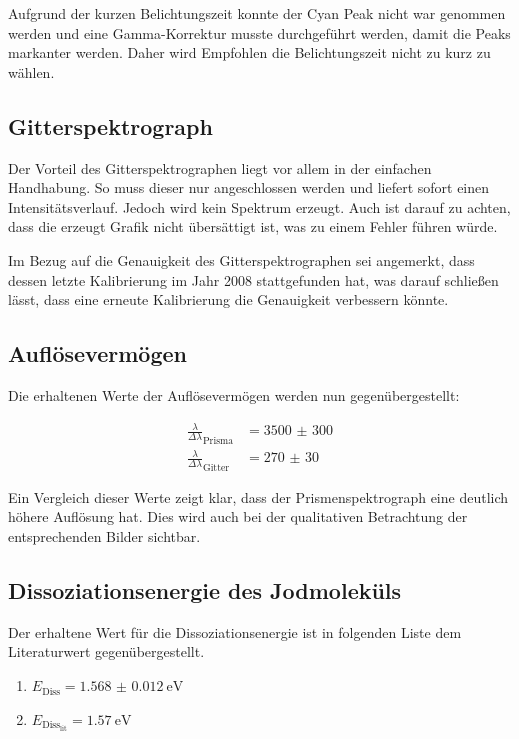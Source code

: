 \documentclass[12pt,english,ngerman]{scrartcl}
\begin{document}
Aufgrund der kurzen Belichtungszeit konnte der Cyan Peak nicht war genommen
werden und eine Gamma-Korrektur musste durchgeführt werden, damit die Peaks
markanter werden. Daher wird Empfohlen die Belichtungszeit nicht zu kurz zu
wählen.

\subsection{Gitterspektrograph}

Der Vorteil des Gitterspektrographen liegt vor allem in der einfachen
Handhabung. So muss dieser nur angeschlossen werden und liefert sofort einen
Intensitätsverlauf. Jedoch wird kein Spektrum erzeugt. Auch ist darauf zu
achten, dass die erzeugt Grafik nicht übersättigt ist, was zu einem Fehler
führen würde.

Im Bezug auf die Genauigkeit des Gitterspektrographen sei angemerkt, dass
dessen letzte Kalibrierung im Jahr 2008 stattgefunden hat, was darauf schließen
lässt, dass eine erneute Kalibrierung die Genauigkeit verbessern könnte.

\subsection{Auflösevermögen}
Die erhaltenen Werte der Auflösevermögen werden nun gegenübergestellt:

\begin{align*}
	\frac{\lambda}{\Delta\lambda}_\text{Prisma} & = \num{3500(300)} \\
	\frac{\lambda}{\Delta\lambda}_\text{Gitter} & = \num{270(30)}
\end{align*}

Ein Vergleich dieser Werte zeigt klar, dass der Prismenspektrograph eine
deutlich höhere Auflösung hat. Dies wird auch bei der qualitativen Betrachtung
der entsprechenden Bilder sichtbar.

\subsection{Dissoziationsenergie des Jodmoleküls}

Der erhaltene Wert für die Dissoziationsenergie ist in folgenden Liste dem
Literaturwert gegenübergestellt.

\begin{enumerate}
	\item $E_\text{Diss} = \SI{1.568(12)}{\electronvolt}$
	\item $E_{\text{Diss}_\text{lit}} = \SI{1.57}{\electronvolt}$~\cite{noauthor_bond-dissociation_2023}
\end{enumerate}
\end{document}
